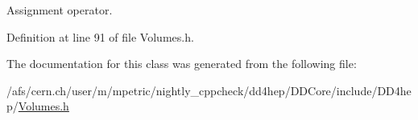 Assignment operator. 

Definition at line 91 of file Volumes.h.

The documentation for this class was generated from the following file:\begin{DoxyCompactItemize}
\item 
/afs/cern.ch/user/m/mpetric/nightly\_\-cppcheck/dd4hep/DDCore/include/DD4hep/\hyperlink{_volumes_8h}{Volumes.h}\end{DoxyCompactItemize}
